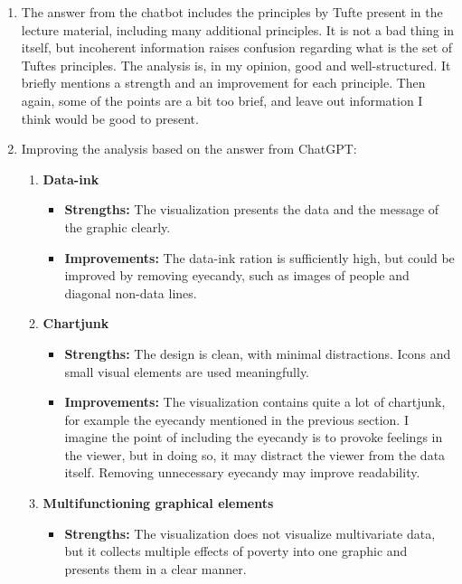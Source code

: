 \documentclass[11pt,a4paper,titlepage]{article}
\begin{document}
\begin{enumerate}
\begin{enumerate}
\begin{enumerate}
\begin{enumerate}
        \end{enumerate}
    \end{enumerate}
        \item The answer from the chatbot includes the principles by Tufte present in the lecture material, including many additional principles. It is not a bad thing in itself, but incoherent information raises confusion regarding what is the set of Tuftes principles. The analysis is, in my opinion, good and well-structured. It briefly mentions a strength and an improvement for each principle. Then again, some of the points are a bit too brief, and leave out information I think would be good to present.
        \item Improving the analysis based on the answer from ChatGPT:
        \begin{enumerate}
            \item \textbf{Data-ink}
                \begin{itemize}
                    \item \textbf{Strengths:} The visualization presents the data and the message of the graphic clearly.
                    \item \textbf{Improvements:} The data-ink ration is sufficiently high, but could be improved by removing eyecandy, such as images of people and diagonal non-data lines.
                \end{itemize}
            \item \textbf{Chartjunk}
                \begin{itemize}
                    \item \textbf{Strengths:} The design is clean, with minimal distractions. Icons and small visual elements are used meaningfully.
                    \item \textbf{Improvements:} The visualization contains quite a lot of chartjunk, for example the eyecandy mentioned in the previous section. I imagine the point of including the eyecandy is to provoke feelings in the viewer, but in doing so, it may distract the viewer from the data itself. Removing unnecessary eyecandy may improve readability.
                \end{itemize}
            \item \textbf{Multifunctioning graphical elements}
                \begin{itemize}
                    \item \textbf{Strengths:} The visualization does not visualize multivariate data, but it collects multiple effects of poverty into one graphic and presents them in a clear manner.

\end{itemize}
\end{enumerate}
\end{enumerate}
\end{enumerate}
\end{document}
